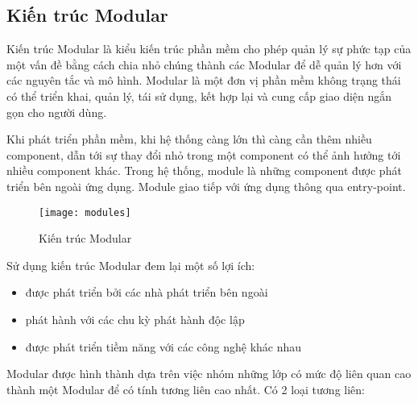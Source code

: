 \subsection{Kiến trúc Modular}

Kiến trúc Modular là kiểu kiến trúc phần mềm cho phép quản lý sự phức tạp của một vấn đề bằng cách chia nhỏ chúng thành các Modular để dễ quản lý hơn với các nguyên tắc và mô hình. Modular là một đơn vị phần mềm không trạng thái có thể triển khai, quản lý, tái sử dụng, kết hợp lại và cung cấp giao diện ngắn gọn cho người dùng.

Khi phát triển phần mềm, khi hệ thống càng lớn thì càng cần thêm nhiều component, dẫn tới sự thay đổi nhỏ trong một component có thể ảnh hưởng tới nhiều component khác. Trong hệ thống, module là những component được phát triển bên ngoài ứng dụng. Module giao tiếp với ứng dụng thông qua entry-point.

\begin{figure}[H]
	\centering
	\texttt{[image: modules]}
	\caption{Kiến trúc Modular}
\end{figure}

Sử dụng kiến trúc Modular đem lại một số lợi ích:

\begin{itemize}
	\begin{itemize}
		\item được phát triển bởi các nhà phát triển bên ngoài
		\item phát hành với các chu kỳ phát hành độc lập
		\item được phát triển tiềm năng với các công nghệ khác nhau
	\end{itemize}
\end{itemize}

Modular được hình thành dựa trên việc nhóm những lớp có mức độ liên quan cao thành một Modular để có tính tương liên cao nhất. Có 2 loại tương liên:

